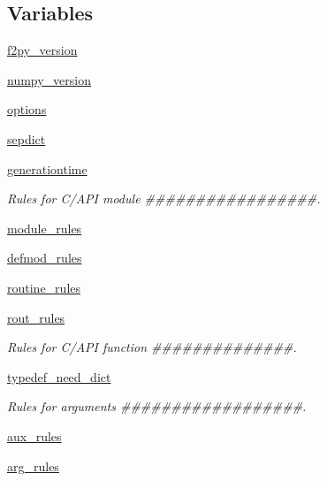 \subsection*{Variables}
\begin{DoxyCompactItemize}
\item 
\hyperlink{namespacenumpy_1_1f2py_1_1rules_a6e3c4d65d6adcf5b4d34e80e96d183e3}{f2py\+\_\+version}
\item 
\hyperlink{namespacenumpy_1_1f2py_1_1rules_a38a9762352f362e5d69b47e304448ea4}{numpy\+\_\+version}
\item 
\hyperlink{namespacenumpy_1_1f2py_1_1rules_af2839147678b6792603b2e2e862b1c3c}{options}
\item 
\hyperlink{namespacenumpy_1_1f2py_1_1rules_ad1c598a42df5cbc803eab94d52e80d16}{sepdict}
\item 
\hyperlink{namespacenumpy_1_1f2py_1_1rules_a2b61a575c58738c7cb3d2a4bae108cae}{generationtime}
\begin{DoxyCompactList}\small\item\em Rules for C/\+A\+PI module \#\#\#\#\#\#\#\#\#\#\#\#\#\#\#\#\#. \end{DoxyCompactList}\item 
\hyperlink{namespacenumpy_1_1f2py_1_1rules_ad4f52b1d297007269829430650d8c4ad}{module\+\_\+rules}
\item 
\hyperlink{namespacenumpy_1_1f2py_1_1rules_a2ca453ef52e767e9cf714b52584ed939}{defmod\+\_\+rules}
\item 
\hyperlink{namespacenumpy_1_1f2py_1_1rules_aaaf81fc77995c6c1650769b68eceddaf}{routine\+\_\+rules}
\item 
\hyperlink{namespacenumpy_1_1f2py_1_1rules_ad656642e81138c43c16cea2ef6f0e522}{rout\+\_\+rules}
\begin{DoxyCompactList}\small\item\em Rules for C/\+A\+PI function \#\#\#\#\#\#\#\#\#\#\#\#\#\#. \end{DoxyCompactList}\item 
\hyperlink{namespacenumpy_1_1f2py_1_1rules_a3077b393c81ea2ac15b6a4fc91303563}{typedef\+\_\+need\+\_\+dict}
\begin{DoxyCompactList}\small\item\em Rules for arguments \#\#\#\#\#\#\#\#\#\#\#\#\#\#\#\#\#\#. \end{DoxyCompactList}\item 
\hyperlink{namespacenumpy_1_1f2py_1_1rules_a41a35fb7249658df913080fcc65b5e18}{aux\+\_\+rules}
\item 
\hyperlink{namespacenumpy_1_1f2py_1_1rules_ab88801f33f30bc38f1fd5e915a195f9b}{arg\+\_\+rules}

\end{DoxyCompactItemize}
